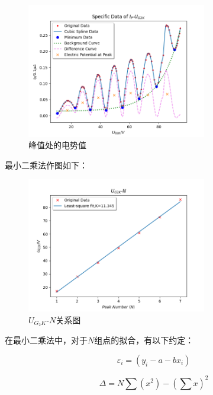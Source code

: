\documentclass[a4paper,UTF8]{ctexart}
\begin{document}
\begin{figure}[H]
    \centering
    \begin{minipage}[b]{0.9\textwidth}
        \centering
        \includegraphics[width=0.7\textwidth]{./peak.png}
        \caption{峰值处的电势值}
    \end{minipage}
\end{figure}


最小二乘法作图如下：

\begin{figure}[H]
    \centering
    \begin{minipage}[b]{0.9\textwidth}
        \centering
        \includegraphics[width=0.7\textwidth]{./ls.png}
        \caption{$U_{G_{2}K}$-$N$关系图}
    \end{minipage}
\end{figure}

在最小二乘法中，对于$N$组点的拟合，有以下约定：

\begin{equation}
    \varepsilon_i = (y_i - a - b x_i)
\end{equation}

\begin{equation}
    \Delta = N \sum(x^2) - (\sum x)^2
\end{equation}
\end{document}
